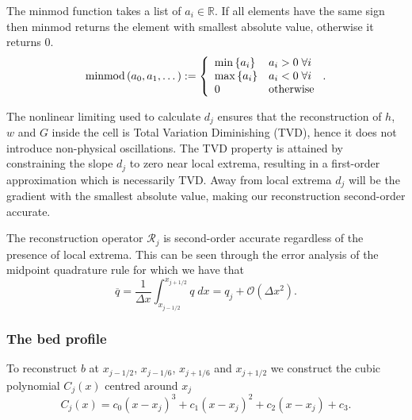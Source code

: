 \begin{defn}
The minmod function takes a list of $a_i \in \mathbb{R}$. If all elements have the same sign then minmod returns the element with smallest absolute value, otherwise it returns $0$. 
	\begin{equation*}
	\text{minmod}\left(a_0,a_1,\dots\right) := \left\lbrace \begin{array}{l l}
	\min\left\lbrace a_i\right\rbrace & a_i > 0 \; \forall i \\
	\max\left\lbrace a_i\right\rbrace & a_i < 0  \; \forall i \\
	0 & \text{otherwise}\\
	\end{array} \right. . 
	\end{equation*}
\end{defn}
The nonlinear limiting used to calculate $d_j$ ensures that the reconstruction of $h$, $w$ and $G$ inside the cell is Total Variation Diminishing (TVD), hence it does not introduce non-physical oscillations. The TVD property is attained by constraining the slope $d_j$ to zero near local extrema, resulting in a first-order approximation which is necessarily TVD. Away from local extrema $d_j$ will be the gradient with the smallest absolute value, making our reconstruction second-order accurate.

The reconstruction operator $\mathcal{R}_{j} $ is second-order accurate regardless of the presence of local extrema. This can be seen through the error analysis of the midpoint quadrature rule for which we have that
\begin{equation}
\overline{q} = \frac{1}{\Delta x} \int_{x_{j-1/2}}^{x_{j+1/2}} q \; dx = q_j + \mathcal{O}\left(\Delta x^2\right).
\end{equation}

\subsubsection{The bed profile}
To reconstruct $b$ at $x_{j-1/2}$, $x_{j-1/6}$, $x_{j+1/6}$ and $x_{j+1/2}$ we construct the cubic polynomial $C_j(x)$ centred around $x_j$
\begin{equation}
C_j(x) = c_0 \left(x - x_j\right)^3 + c_1 \left(x - x_j\right)^2 + c_2 \left(x - x_j\right) + c_3.
\label{eqn:cubicforbedrecon}
\end{equation}

